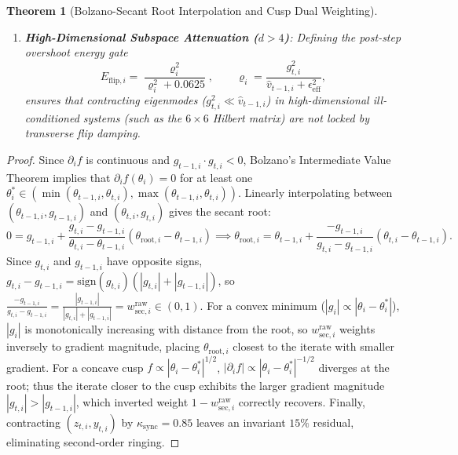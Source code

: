 \documentclass[10pt,twocolumn,letterpaper]{article}
\newtheorem{theorem}{Theorem}[section]
\theoremstyle{definition}
\theoremstyle{remark}
\newcommand{\epseff}{\epsilon_{\mathrm{eff}}}
\begin{document}
\begin{theorem}[Bolzano-Secant Root Interpolation and Cusp Dual Weighting]
\begin{enumerate}[leftmargin=*,nosep,label=(\roman*)]
  \item \textbf{High-Dimensional Subspace Attenuation ($d > 4$)}: Defining the post-step overshoot energy gate
  \begin{equation}
    E_{\mathrm{flip},i} = \frac{\varrho_i^2}{\varrho_i^2 + 0.0625}, \qquad \varrho_i = \frac{g_{t,i}^2}{\hat{v}_{t-1,i} + \epseff^2},
    \label{eq:energy_gate}
  \end{equation}
  ensures that contracting eigenmodes ($g_{t,i}^2 \ll \hat{v}_{t-1,i}$) in high-dimensional ill-conditioned systems (such as the $6 \times 6$ Hilbert matrix) are not locked by transverse flip damping.
\end{enumerate}
\end{theorem}

\begin{proof}
Since $\partial_i f$ is continuous and $g_{t-1, i} \cdot g_{t, i} < 0$, Bolzano's Intermediate Value Theorem implies that $\partial_i f(\theta_i) = 0$ for at least one $\theta_i^* \in (\min(\theta_{t-1, i}, \theta_{t, i}), \max(\theta_{t-1, i}, \theta_{t, i}))$. Linearly interpolating between $( \theta_{t-1, i}, g_{t-1, i} )$ and $( \theta_{t, i}, g_{t, i} )$ gives the secant root:
\begin{equation*}
  0 = g_{t-1, i} + \frac{g_{t, i} - g_{t-1, i}}{\theta_{t, i} - \theta_{t-1, i}}\left(\theta_{\mathrm{root}, i} - \theta_{t-1, i}\right) \implies \theta_{\mathrm{root}, i} = \theta_{t-1, i} + \frac{-g_{t-1, i}}{g_{t, i} - g_{t-1, i}}\left(\theta_{t, i} - \theta_{t-1, i}\right).
\end{equation*}
Since $g_{t, i}$ and $g_{t-1, i}$ have opposite signs, $g_{t, i} - g_{t-1, i} = \mathrm{sign}(g_{t, i})(|g_{t, i}| + |g_{t-1, i}|)$, so $\frac{-g_{t-1, i}}{g_{t, i} - g_{t-1, i}} = \frac{|g_{t-1, i}|}{|g_{t, i}| + |g_{t-1, i}|} = w_{\mathrm{sec}, i}^{\mathrm{raw}} \in (0, 1)$. For a convex minimum ($|g_i| \propto |\theta_i - \theta_i^*|$), $|g_i|$ is monotonically increasing with distance from the root, so $w_{\mathrm{sec}, i}^{\mathrm{raw}}$ weights inversely to gradient magnitude, placing $\theta_{\mathrm{root}, i}$ closest to the iterate with smaller gradient. For a concave cusp $f \propto |\theta_i - \theta_i^*|^{1/2}$, $|\partial_i f| \propto |\theta_i - \theta_i^*|^{-1/2}$ diverges at the root; thus the iterate closer to the cusp exhibits the larger gradient magnitude $|g_{t, i}| > |g_{t-1, i}|$, which inverted weight $1 - w_{\mathrm{sec}, i}^{\mathrm{raw}}$ correctly recovers. Finally, contracting $(z_{t, i}, y_{t, i})$ by $\kappa_{\mathrm{sync}} = 0.85$ leaves an invariant $15\%$ residual, eliminating second-order ringing.
\end{proof}
\end{document}
